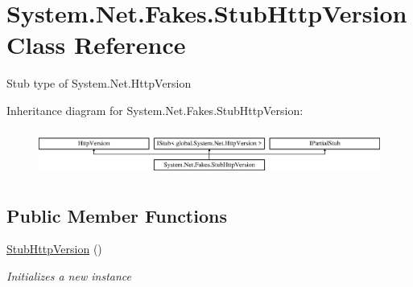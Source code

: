 \hypertarget{class_system_1_1_net_1_1_fakes_1_1_stub_http_version}{\section{System.\-Net.\-Fakes.\-Stub\-Http\-Version Class Reference}
\label{class_system_1_1_net_1_1_fakes_1_1_stub_http_version}
}


Stub type of System.\-Net.\-Http\-Version 


Inheritance diagram for System.\-Net.\-Fakes.\-Stub\-Http\-Version\-:\begin{figure}[H]
\begin{center}
\leavevmode
\includegraphics[height=1.536351cm]{class_system_1_1_net_1_1_fakes_1_1_stub_http_version}
\end{center}
\end{figure}
\subsection*{Public Member Functions}
\begin{DoxyCompactItemize}
\item 
\hyperlink{class_system_1_1_net_1_1_fakes_1_1_stub_http_version_aae10a6873ecc27aa871ac5ef07d06e6b}{Stub\-Http\-Version} ()
\begin{DoxyCompactList}\small\item\em Initializes a new instance\end{DoxyCompactList}\end{DoxyCompactItemize}
